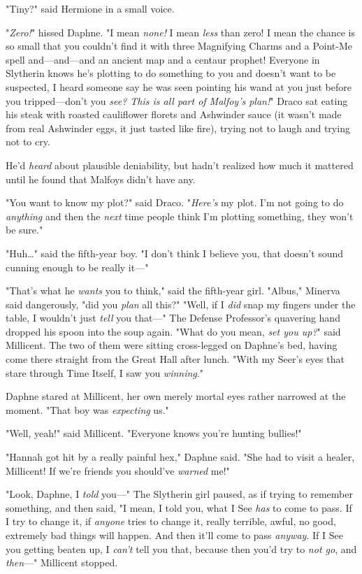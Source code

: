 "Tiny?" said Hermione in a small voice.

"\emph{Zero!}" hissed Daphne. "I mean \emph{none!} I mean \emph{less} than 
zero! I mean the chance is so small that you couldn't find it with three 
Magnifying Charms and a Point-Me spell and---and---and an ancient map and a 
centaur prophet! Everyone in Slytherin knows he's plotting to do something to 
you and doesn't want to be suspected, I heard someone say he was seen pointing 
his wand at you just before you tripped---don't you \emph{see? This is all part 
of Malfoy's plan!}"
\sbreak
Draco sat eating his steak with roasted cauliflower florets and Ashwinder sauce 
(it wasn't made from real Ashwinder eggs, it just tasted like fire), trying not 
to laugh and trying not to cry.

He'd \emph{heard} about plausible deniability, but hadn't realized how much it 
mattered until he found that Malfoys didn't have any.

"You want to know my plot?" said Draco. "\emph{Here's} my plot. I'm not going 
to do \emph{anything} and then the \emph{next} time people think I'm plotting 
something, they won't be sure."

"Huh{\ldots}" said the fifth-year boy. "I don't think I believe you, that 
doesn't sound cunning enough to be really it---"

"That's what he \emph{wants} you to think," said the fifth-year girl.
\sbreak
"Albus," Minerva said dangerously, "did you \emph{plan} all this?"
\sbreak
"Well, if I \emph{did} snap my fingers under the table, I wouldn't just 
\emph{tell} you that---"
\sbreak
The Defense Professor's quavering hand dropped his spoon into the soup again.
\sbreak
"What do you mean, \emph{set you up?}" said Millicent. The two of them were 
sitting cross-legged on Daphne's bed, having come there straight from the Great 
Hall after lunch. "With my Seer's eyes that stare through Time Itself, I saw 
you \emph{winning}."

Daphne stared at Millicent, her own merely mortal eyes rather narrowed at the 
moment. "That boy was \emph{expecting} us."

"Well, yeah!" said Millicent. "Everyone knows you're hunting bullies!"

"Hannah got hit by a really painful hex," Daphne said. "She had to visit a 
healer, Millicent! If we're friends you should've \emph{warned} me!"

"Look, Daphne, I \emph{told} you---" The Slytherin girl paused, as if trying to 
remember something, and then said, "I mean, I told you, what I See \emph{has} 
to come to pass. If I try to change it, if \emph{anyone} tries to change it, 
really terrible, awful, no good, extremely bad things will happen. And then 
it'll come to pass \emph{anyway}. If I See you getting beaten up, I 
\emph{can't} tell you that, because then you'd try to \emph{not go}, and 
\emph{then}---" Millicent stopped.

